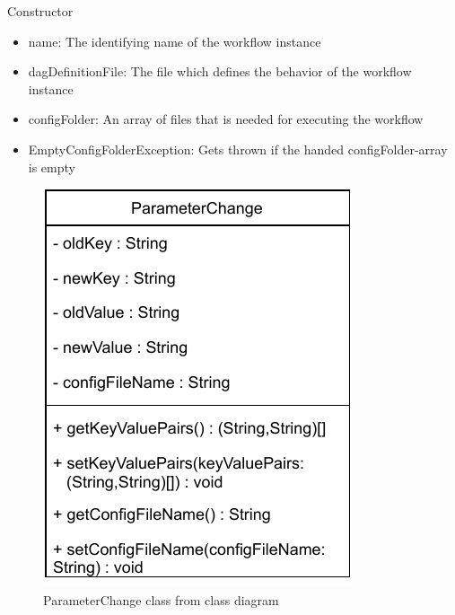 \begin{methodenv}{Constructor}


\begin{itemize}
	\item{name:}
	The identifying name of the workflow instance
	\item{dagDefinitionFile:}
	The file which defines the behavior of the workflow instance
	\item{configFolder:}
	An array of files that is needed for executing the workflow
\end{itemize}

\begin{itemize}
	\item{EmptyConfigFolderException:}
	Gets thrown if the handed configFolder-array is empty
\end{itemize}

\end{methodenv}



\begin{figure}[h]
\centerline{\includegraphics[scale=1]{res/Klassen/ParameterChange.pdf}}
\caption{ParameterChange class from class diagram}
\end{figure}

